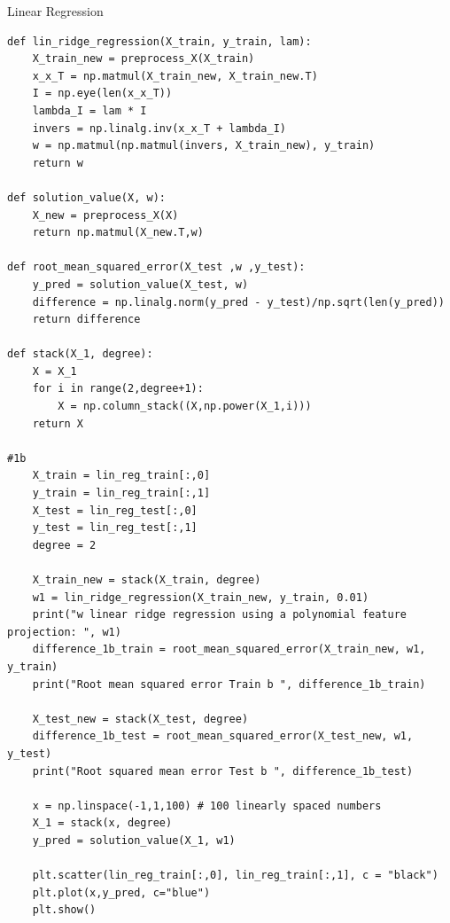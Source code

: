 \begin{task}{Linear Regression}
\begin{subtask}
\begin{lstlisting}
def lin_ridge_regression(X_train, y_train, lam):
    X_train_new = preprocess_X(X_train)
    x_x_T = np.matmul(X_train_new, X_train_new.T)
    I = np.eye(len(x_x_T))
    lambda_I = lam * I
    invers = np.linalg.inv(x_x_T + lambda_I)
    w = np.matmul(np.matmul(invers, X_train_new), y_train)
    return w

def solution_value(X, w):
    X_new = preprocess_X(X)
    return np.matmul(X_new.T,w)
    
def root_mean_squared_error(X_test ,w ,y_test):
    y_pred = solution_value(X_test, w)
    difference = np.linalg.norm(y_pred - y_test)/np.sqrt(len(y_pred))
    return difference

def stack(X_1, degree):
    X = X_1
    for i in range(2,degree+1):
        X = np.column_stack((X,np.power(X_1,i)))
    return X
    
#1b
    X_train = lin_reg_train[:,0]
    y_train = lin_reg_train[:,1]
    X_test = lin_reg_test[:,0]
    y_test = lin_reg_test[:,1]
    degree = 2
    
    X_train_new = stack(X_train, degree)
    w1 = lin_ridge_regression(X_train_new, y_train, 0.01)
    print("w linear ridge regression using a polynomial feature projection: ", w1)
    difference_1b_train = root_mean_squared_error(X_train_new, w1, y_train)
    print("Root mean squared error Train b ", difference_1b_train)
    
    X_test_new = stack(X_test, degree)
    difference_1b_test = root_mean_squared_error(X_test_new, w1, y_test)
    print("Root squared mean error Test b ", difference_1b_test)
    
    x = np.linspace(-1,1,100) # 100 linearly spaced numbers
    X_1 = stack(x, degree)
    y_pred = solution_value(X_1, w1)
    
    plt.scatter(lin_reg_train[:,0], lin_reg_train[:,1], c = "black")
    plt.plot(x,y_pred, c="blue")
    plt.show()


\end{lstlisting}
\end{subtask}
\end{task}
